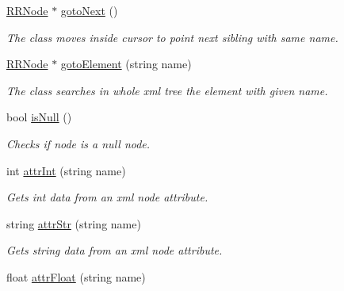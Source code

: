 \begin{DoxyCompactItemize}
\hyperlink{classRRNode}{RRNode} $\ast$ \hyperlink{classRRNode_aa69d40ffbc4fb9fddf400cb504dd68f7}{gotoNext} ()
\begin{DoxyCompactList}\small\item\em The class moves inside cursor to point next sibling with same name. \item\end{DoxyCompactList}\item 
\hyperlink{classRRNode}{RRNode} $\ast$ \hyperlink{classRRNode_a7c15ed7e9ca72831b35269db79ed8010}{gotoElement} (string name)
\begin{DoxyCompactList}\small\item\em The class searches in whole xml tree the element with given name. \item\end{DoxyCompactList}\item 
\hypertarget{classRRNode_a8dd8057195cae326c1ad00bbb3d774ad}{
bool \hyperlink{classRRNode_a8dd8057195cae326c1ad00bbb3d774ad}{isNull} ()}
\label{classRRNode_a8dd8057195cae326c1ad00bbb3d774ad}

\begin{DoxyCompactList}\small\item\em Checks if node is a null node. \item\end{DoxyCompactList}\item 
int \hyperlink{classRRNode_a20a94447332963a2a7440ec107db2519}{attrInt} (string name)
\begin{DoxyCompactList}\small\item\em Gets int data from an xml node attribute. \item\end{DoxyCompactList}\item 
\hypertarget{classRRNode_ab89066a02e0ae28aa573c42a6a4b07e6}{
string \hyperlink{classRRNode_ab89066a02e0ae28aa573c42a6a4b07e6}{attrStr} (string name)}
\label{classRRNode_ab89066a02e0ae28aa573c42a6a4b07e6}

\begin{DoxyCompactList}\small\item\em Gets string data from an xml node attribute. \item\end{DoxyCompactList}\item 
\hypertarget{classRRNode_a85b609efe3c28b51e24b2f28a534f4df}{
float \hyperlink{classRRNode_a85b609efe3c28b51e24b2f28a534f4df}{attrFloat} (string name)}
\label{classRRNode_a85b609efe3c28b51e24b2f28a534f4df}


\end{DoxyCompactItemize}

